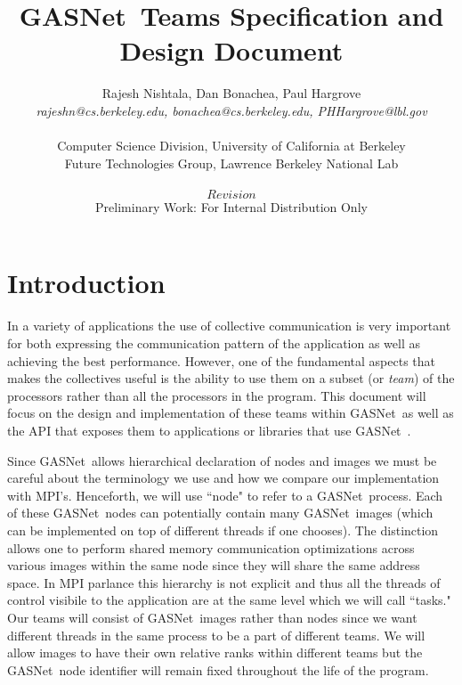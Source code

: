 \documentclass[times,10pt]{article}
\begin{document}
\newcommand{\gasnet}[0]{GASNet\ }





\title{\gasnet Teams Specification and Design Document}
\author{Rajesh Nishtala, Dan Bonachea, Paul Hargrove\\
    \emph{rajeshn@cs.berkeley.edu, bonachea@cs.berkeley.edu, PHHargrove@lbl.gov} \\\\
    Computer Science Division, University of California at Berkeley \\ 
    Future Technologies Group, Lawrence Berkeley National Lab\\ \\
    $Revision$ \\
    Preliminary Work: For Internal Distribution Only}
\maketitle


\section{Introduction}
In a variety of applications the use of collective communication is very
important for both expressing the communication pattern of the application as
well as achieving the best performance. However, one of the fundamental aspects
that makes the collectives useful is the ability to use them on a subset (or
\textit{team}) of the processors rather than all the processors in the program.
This document will focus on the design and implementation of these teams within
\gasnet as well as the API that exposes them to applications or libraries that
use \gasnet. 

Since \gasnet allows hierarchical declaration of nodes and images we must be
careful about the terminology we use and how we compare our implementation with
MPI's. Henceforth, we will use ``node" to refer to a \gasnet process. Each of
these \gasnet nodes can potentially contain many  \gasnet images (which can be
implemented on top of different threads if one chooses). The distinction allows
one to perform shared memory communication optimizations across various images
within the same node since they will share the same address space. In MPI
parlance this hierarchy is not explicit and thus all the threads of control
visibile to the application are at the same level which we will call ``tasks."
Our teams will consist of \gasnet images rather than nodes since we want
different threads in the same process to be a part of different teams. We will
allow images to have their own relative ranks within different teams but the
\gasnet node identifier will remain fixed throughout the life of the program. 
\end{document}
